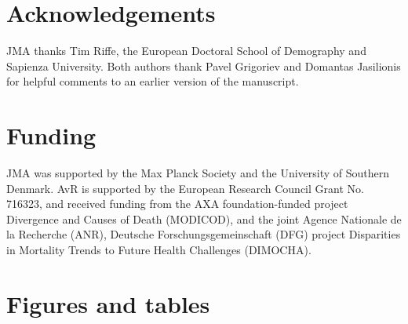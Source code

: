 \documentclass{article}
\begin{document}
\begin{spacing}{1.5}
\section*{Acknowledgements}
JMA thanks Tim Riffe, the European Doctoral School of Demography and Sapienza University. Both authors thank Pavel Grigoriev and Domantas Jasilionis for helpful comments to an earlier version of the manuscript. 

\section*{Funding}
JMA was supported by the Max Planck Society and the University of Southern Denmark. AvR is supported by the European Research Council Grant No. 716323, and received funding from the AXA foundation-funded project Divergence and Causes of Death (MODICOD), and the joint Agence Nationale de la Recherche (ANR), Deutsche Forschungsgemeinschaft (DFG) project Disparities in Mortality Trends to Future Health Challenges (DIMOCHA). 

\end{spacing}

\newpage

 

\newpage

\section*{Figures and tables}
\end{document}
